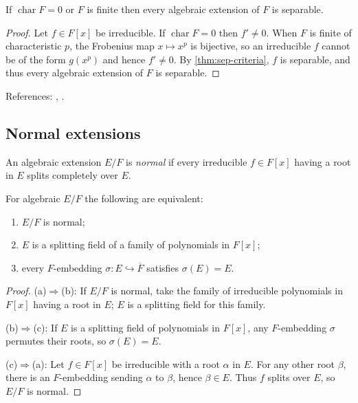 \begin{corollary}
If $\operatorname{char}F=0$ or $F$ is finite then every algebraic extension of $F$ is separable.
\end{corollary}
\begin{proof}
Let $f\in F[x]$ be irreducible. If $\operatorname{char}F=0$ then $f'\ne0$.
When $F$ is finite of characteristic $p$, the Frobenius map $x\mapsto x^p$ is
bijective, so an irreducible $f$ cannot be of the form $g(x^p)$ and hence
$f'\ne0$. By \cref{thm:sep-criteria}, $f$ is separable, and thus every algebraic
extension of $F$ is separable.
\end{proof}
References: \cite[\S13--14]{DF}, \cite[Ch.~VIII]{Lang}.

\subsection{Normal extensions}
\begin{definition}
An algebraic extension $E/F$ is \emph{normal} if every irreducible $f\in F[x]$ having a root in $E$ splits completely over $E$.
\end{definition}
\begin{theorem}\label{thm:normal}
For algebraic $E/F$ the following are equivalent:
\begin{enumerate}[label=(\alph*)]
\item $E/F$ is normal;
\item $E$ is a splitting field of a family of polynomials in $F[x]$;
\item every $F$-embedding $\sigma:E\hookrightarrow\overline{F}$ satisfies $\sigma(E)=E$.
\end{enumerate}
\end{theorem}
\begin{proof}
(a)$\Rightarrow$(b): If $E/F$ is normal, take the family of irreducible
polynomials in $F[x]$ having a root in $E$; $E$ is a splitting field for this
family.

(b)$\Rightarrow$(c): If $E$ is a splitting field of polynomials in $F[x]$, any
$F$-embedding $\sigma$ permutes their roots, so $\sigma(E)=E$.

(c)$\Rightarrow$(a): Let $f\in F[x]$ be irreducible with a root $\alpha$ in $E$.
For any other root $\beta$, there is an $F$-embedding sending $\alpha$ to
$\beta$, hence $\beta\in E$. Thus $f$ splits over $E$, so $E/F$ is normal.
\end{proof}

